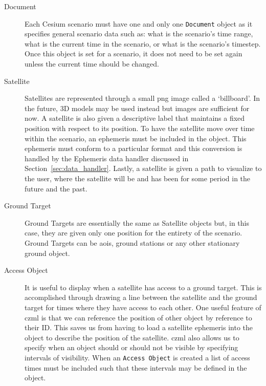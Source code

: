 \begin{description} 

    \item[Document] Each Cesium scenario must have one and only one
	\texttt{Document} object as it specifies general scenario data such as:
	what is the scenario's time range, what is the current time in the
	scenario, or what is the scenario's timestep. Once this object is set
	for a scenario, it does not need to be set again unless the current
	time should be changed.

    \item[Satellite] Satellites are represented through a small \gls{png} image
	called a `billboard'. In the future, 3D models may be used instead but
	images are sufficient for now. A satellite is also given a descriptive
	label that maintains a fixed position with respect to its position. To
	have the satellite move over time within the scenario, an ephemeris
	must be included in the object.  This ephemeris must conform to a
	particular format and this conversion is handled by the Ephemeris data
	handler discussed in Section~\ref{sec:data_handler}.  Lastly, a
	satellite is given a path to visualize to the user, where the satellite
	will be and has been for some period in the future and the past.

    \item[Ground Target] Ground Targets are essentially the same as Satellite
	objects but, in this case, they are given only one position for the
	entirety of the scenario. Ground Targets can be \glspl{aoi}, ground
	stations or any other stationary ground object.

    \item[Access Object] It is useful to display when a satellite has access to
	a ground target. This is accomplished through drawing a line between
	the satellite and the ground target for times where they have access to
	each other. One useful feature of \gls{czml} is that we can reference
	the position of other object by reference to their ID. This saves us
	from having to load a satellite ephemeris into the object to describe
	the position of the satellite. \gls{czml} also allows us to specify
	when an object should or should not be visible by specifying intervals
	of visibility. When an \texttt{Access Object} is created a list of
	access times must be included such that these intervals may be defined
	in the object.


\end{description}
